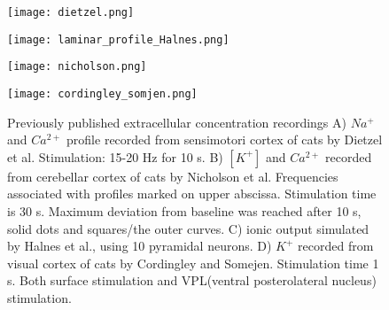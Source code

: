 \documentclass{article}
\begin{document}
\begin{figure}[!tbp]
  \centering
  \begin{minipage}[b]{0.45\textwidth}
    \texttt{[image: dietzel.png]}
  \end{minipage}
  \hfill
  \begin{minipage}[b]{0.45\textwidth}
    \texttt{[image: laminar\_profile\_Halnes.png]}
  \end{minipage}
    \begin{minipage}[b]{0.45\textwidth}
    \texttt{[image: nicholson.png]}
  \end{minipage}
  \hfill
  \begin{minipage}[b]{0.45\textwidth}
    \texttt{[image: cordingley\_somjen.png]}
  \end{minipage}
  \caption{Previously published extracellular concentration recordings A) $Na^+$ and $Ca^{2+}$ profile recorded from sensimotori cortex of cats by Dietzel et al. Stimulation: 15-20 Hz for 10 s. B) $[K^+]$ and $Ca^{2+}$  recorded from cerebellar cortex of cats by Nicholson et al. Frequencies associated with profiles marked on upper abscissa. Stimulation time is 30 s. Maximum deviation from baseline was reached after 10 s, solid dots and squares/the outer curves. C) ionic output simulated by Halnes et al., using 10 pyramidal neurons. D) $K^+$ recorded from visual cortex of cats by Cordingley and Somejen. Stimulation time 1 s. Both surface stimulation and VPL(ventral posterolateral nucleus) stimulation.
}
  \label{fig:data sets}
\end{figure} 
\end{document}
